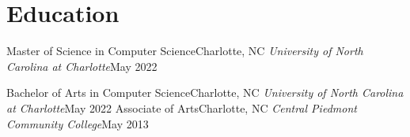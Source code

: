 \section{Education}
  \resumeSubHeadingListStart

    \resumeSubheading
      {\color{blue}Master of Science in Computer Science}{Charlotte, NC}
      {\it{}University of North Carolina at Charlotte}{May 2022}
      \resumeItemListStart
      \resumeItemListEnd

    \vspace{-5pt}

    \resumeSubheading
      {\color{blue}Bachelor of Arts in Computer Science}{Charlotte, NC}
      {\it{}University of North Carolina at Charlotte}{May 2022}
      \resumeItemListStart
      \resumeItemListEnd
    \vspace{-5pt}
    \resumeSubheading
      {\color{blue}Associate of Arts}{Charlotte, NC}
      {\it{}Central Piedmont Community College}{May 2013}
      \resumeItemListStart

      \resumeItemListEnd  
      
  \resumeSubHeadingListEnd